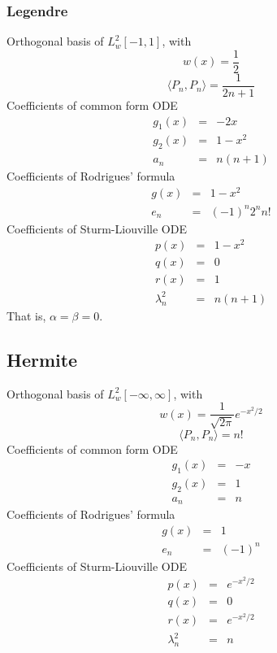 \documentclass[oneside,a4paper,11pt]{article}
\begin{document}
\subsubsection{Legendre}
Orthogonal basis of $L^2_w[-1,1]$, with
\[w(x) = \frac{1}{2}\] 
\[\langle P_n,P_n\rangle = \frac{1}{2n+1}\]
Coefficients of common form ODE
\begin{eqnarray*}
g_1(x) &=& -2x\\
g_2(x) &=& 1 - x^2\\
a_n &=& n(n+1)
\end{eqnarray*}
Coefficients of Rodrigues' formula
 \begin{eqnarray*}
g(x) &=& 1 - x^2\\
e_n &=& (-1)^n2^nn!
\end{eqnarray*}
Coefficients of Sturm-Liouville ODE
\begin{eqnarray*}
p(x) &=& 1 - x^2\\
q(x) &=& 0\\
r(x) &=& 1\\
\lambda^2_n &=& n(n+1)
\end{eqnarray*}
That is, $\alpha = \beta = 0$.
\subsection{Hermite}
Orthogonal basis of $L^2_w[-\infty,\infty]$, with
\[w(x) = \frac{1}{\sqrt{2\pi}}e^{-x^2/2}\] 
\[\langle P_n,P_n\rangle = n!\]
Coefficients of common form ODE
\begin{eqnarray*}
g_1(x) &=& -x\\
g_2(x) &=& 1\\
a_n &=& n
\end{eqnarray*}
Coefficients of Rodrigues' formula
 \begin{eqnarray*}
g(x) &=& 1 \\
e_n &=& (-1)^n
\end{eqnarray*}
Coefficients of Sturm-Liouville ODE
\begin{eqnarray*}
p(x) &=& e^{-x^2/2}\\
q(x) &=& 0\\
r(x) &=& e^{-x^2/2}\\
\lambda^2_n &=& n
\end{eqnarray*}

\end{document}
